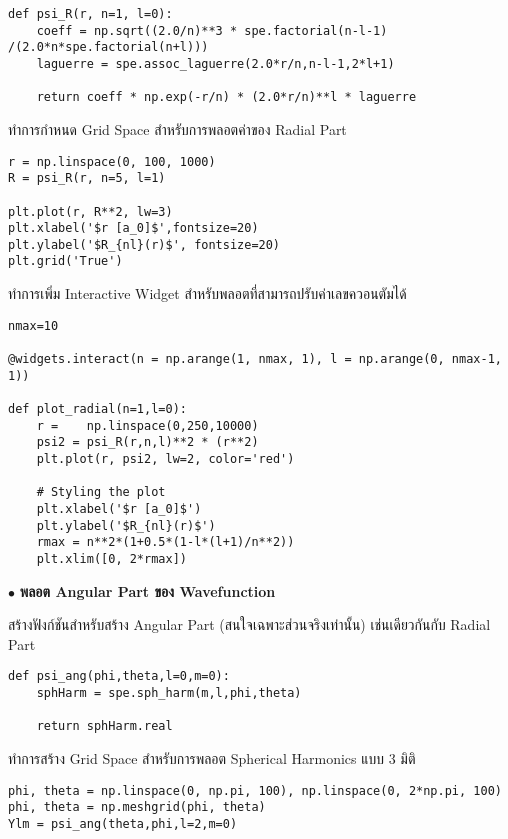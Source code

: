 \begin{lstlisting}[style=MyPython]
def psi_R(r, n=1, l=0):
    coeff = np.sqrt((2.0/n)**3 * spe.factorial(n-l-1) /(2.0*n*spe.factorial(n+l)))
    laguerre = spe.assoc_laguerre(2.0*r/n,n-l-1,2*l+1)
    
    return coeff * np.exp(-r/n) * (2.0*r/n)**l * laguerre
\end{lstlisting}

\noindent ทำการกำหนด Grid Space สำหรับการพลอตค่าของ Radial Part

\begin{lstlisting}[style=MyPython]
r = np.linspace(0, 100, 1000)
R = psi_R(r, n=5, l=1)

plt.plot(r, R**2, lw=3)
plt.xlabel('$r [a_0]$',fontsize=20)
plt.ylabel('$R_{nl}(r)$', fontsize=20)
plt.grid('True')
\end{lstlisting}

\noindent ทำการเพิ่ม Interactive Widget สำหรับพลอตที่สามารถปรับค่าเลขควอนตัมได้

\begin{lstlisting}[style=MyPython]
nmax=10

@widgets.interact(n = np.arange(1, nmax, 1), l = np.arange(0, nmax-1, 1))

def plot_radial(n=1,l=0):
    r =    np.linspace(0,250,10000)
    psi2 = psi_R(r,n,l)**2 * (r**2)
    plt.plot(r, psi2, lw=2, color='red')

    # Styling the plot
    plt.xlabel('$r [a_0]$')
    plt.ylabel('$R_{nl}(r)$')
    rmax = n**2*(1+0.5*(1-l*(l+1)/n**2))
    plt.xlim([0, 2*rmax])
\end{lstlisting}

\bigskip

$\bullet$ \textbf{พลอต Angular Part ของ Wavefunction}

สร้างฟังก์ชันสำหรับสร้าง Angular Part (สนใจเฉพาะส่วนจริงเท่านั้น) เช่นเดียวกันกับ Radial Part

\begin{lstlisting}[style=MyPython]
def psi_ang(phi,theta,l=0,m=0):
    sphHarm = spe.sph_harm(m,l,phi,theta)
    
    return sphHarm.real
\end{lstlisting}

\noindent ทำการสร้าง Grid Space สำหรับการพลอต Spherical Harmonics แบบ 3 มิติ

\begin{lstlisting}[style=MyPython]
phi, theta = np.linspace(0, np.pi, 100), np.linspace(0, 2*np.pi, 100)
phi, theta = np.meshgrid(phi, theta)
Ylm = psi_ang(theta,phi,l=2,m=0)
\end{lstlisting}

